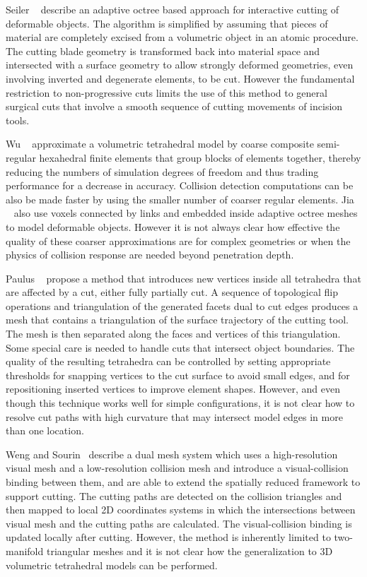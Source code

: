 Seiler \etal~\autocite{seiler:tvc:2011} describe an adaptive octree based approach for interactive cutting of deformable objects.
The algorithm is simplified by assuming that pieces of material are completely excised from a volumetric object in an atomic procedure. The cutting blade geometry is transformed back into material space and intersected with a surface geometry to allow strongly deformed geometries, even involving inverted and degenerate elements, to be cut. However the fundamental restriction to non-progressive cuts limits the use of this method to general surgical cuts that involve a smooth sequence of cutting movements of incision tools.

Wu \etal~\autocite{wu:tvc:2013, wu:cgf:2015} approximate a  volumetric tetrahedral model by coarse composite semi-regular hexahedral finite elements that group blocks of elements together, thereby reducing the numbers of simulation degrees of freedom and thus trading performance for a decrease in accuracy. Collision detection computations can be also be made faster by using the smaller number of coarser regular elements. Jia \etal~\autocite{jia:cst:2017} also use voxels connected by links and embedded inside adaptive octree meshes to model deformable objects. However it is not always clear how effective the quality of these coarser approximations are for complex geometries or when the physics of collision response are needed beyond penetration depth.

Paulus \etal~\autocite{paulus:tvc:2015} propose a method that introduces new vertices inside all tetrahedra that are affected by a cut, either fully partially cut. A sequence of topological flip operations and triangulation of the generated facets dual to cut edges produces a mesh that contains a triangulation of the surface trajectory of the cutting tool. The mesh is then separated along the faces and vertices of this triangulation. Some special care is needed to handle cuts that intersect object boundaries. The quality of the resulting tetrahedra can be controlled by setting appropriate thresholds for snapping vertices to the cut surface to avoid small edges, and for repositioning inserted vertices to improve element shapes. However, and even though this technique works well for simple configurations, it is not clear how to resolve cut paths with high curvature that may intersect  model edges in more than one location.

Weng and Sourin~\autocite{weng:sym:2018} describe a dual mesh system which uses a high-resolution visual mesh and a low-resolution collision mesh and introduce a visual-collision binding between them, and are able to extend the spatially reduced framework to support cutting. The cutting paths are detected on the collision triangles and then mapped to local 2D coordinates systems in which the intersections between visual mesh and the cutting paths are calculated.  The visual-collision binding is updated locally after cutting. However, the method is inherently limited to two-manifold triangular meshes and it is not clear how the generalization to 3D volumetric tetrahedral models can be performed.

